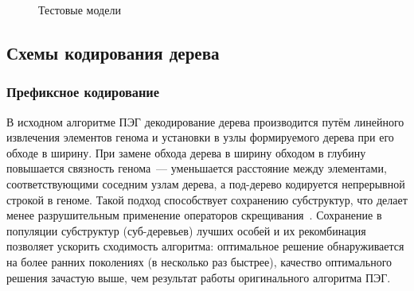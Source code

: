 \begin{figure} [h]
  \center
  \begin{subfigure}[t]{0.3\linewidth}
    \center
  \end{subfigure}
  \begin{subfigure}[t]{0.3\linewidth}
    \center
  \end{subfigure}
  \begin{subfigure}[t]{0.3\linewidth}
    \center
  \end{subfigure}
  \caption{Тестовые модели}
  \label{img:functionz}
\end{figure}





\subsection{Схемы кодирования дерева}

\subsubsection{Префиксное кодирование}

В исходном алгоритме ПЭГ декодирование дерева производится путём линейного извлечения элементов генома и установки в узлы формируемого дерева при его обходе в ширину. При замене обхода дерева в ширину обходом в глубину повышается связность генома~--- уменьшается расстояние между элементами, соответствующими соседним узлам дерева, а под-дерево кодируется непрерывной строкой в геноме. Такой подход способствует сохранению субструктур, что делает менее разрушительным применение операторов скрещивания~\cite{Li:gecco05lbp}. Сохранение в популяции субструктур (суб-деревьев) лучших особей и их рекомбинация позволяет ускорить сходимость алгоритма: оптимальное решение обнаруживается на более ранних поколениях (в несколько раз быстрее), качество оптимального решения зачастую выше, чем результат работы оригинального алгоритма ПЭГ.

